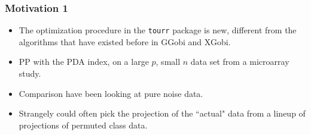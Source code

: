 \documentclass{beamer}
\begin{document}
\begin{frame}
     \frametitle{Motivation 1 }
\begin{itemize}
\item The optimization procedure in the  \texttt{tourr} package is new, different from the algorithms that have existed before in GGobi %
and XGobi. %
\item  PP with the PDA index, on a large $p$, small $n$ data set from a microarray study.
\item Comparison have been looking at pure noise data. 
\item Strangely could often pick the projection of the  ``actual" data from a lineup of projections of permuted class data. 

\end{itemize}	
\end{frame}
\end{document}
